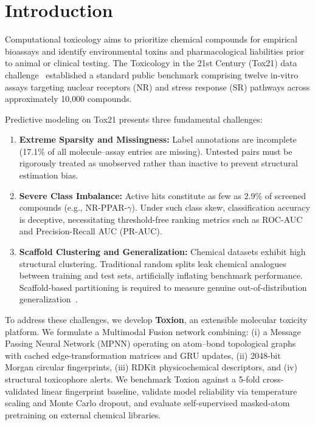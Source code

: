 \documentclass[conference]{IEEEtran}
\begin{document}
\section{Introduction}
Computational toxicology aims to prioritize chemical compounds for empirical bioassays and identify environmental toxins and pharmacological liabilities prior to animal or clinical testing. The Toxicology in the 21st Century (Tox21) data challenge~\cite{huang2016tox21} established a standard public benchmark comprising twelve in-vitro assays targeting nuclear receptors (NR) and stress response (SR) pathways across approximately 10{,}000 compounds.

Predictive modeling on Tox21 presents three fundamental challenges:
\begin{enumerate}
    \item \textbf{Extreme Sparsity and Missingness:} Label annotations are incomplete (17.1\% of all molecule--assay entries are missing). Untested pairs must be rigorously treated as unobserved rather than inactive to prevent structural estimation bias.
    \item \textbf{Severe Class Imbalance:} Active hits constitute as few as 2.9\% of screened compounds (e.g., NR-PPAR-$\gamma$). Under such class skew, classification accuracy is deceptive, necessitating threshold-free ranking metrics such as ROC-AUC and Precision-Recall AUC (PR-AUC).
    \item \textbf{Scaffold Clustering and Generalization:} Chemical datasets exhibit high structural clustering. Traditional random splits leak chemical analogues between training and test sets, artificially inflating benchmark performance. Scaffold-based partitioning is required to measure genuine out-of-distribution generalization~\cite{yang2019analyzing}.
\end{enumerate}

To address these challenges, we develop \textbf{Toxion}, an extensible molecular toxicity platform. We formulate a Multimodal Fusion network combining: (i) a Message Passing Neural Network (MPNN) operating on atom--bond topological graphs with cached edge-transformation matrices and GRU updates, (ii) 2048-bit Morgan circular fingerprints, (iii) RDKit physicochemical descriptors, and (iv) structural toxicophore alerts. We benchmark Toxion against a 5-fold cross-validated linear fingerprint baseline, validate model reliability via temperature scaling and Monte Carlo dropout, and evaluate self-supervised masked-atom pretraining on external chemical libraries.
\end{document}
